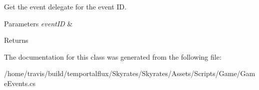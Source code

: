 Get the event delegate for the event I\-D. 


\begin{DoxyParams}{Parameters}
{\em event\-I\-D} & \\
\hline
\end{DoxyParams}
\begin{DoxyReturn}{Returns}

\end{DoxyReturn}


The documentation for this class was generated from the following file\-:\begin{DoxyCompactItemize}
\item 
/home/travis/build/temportalflux/\-Skyrates/\-Skyrates/\-Assets/\-Scripts/\-Game/Game\-Events.\-cs\end{DoxyCompactItemize}
